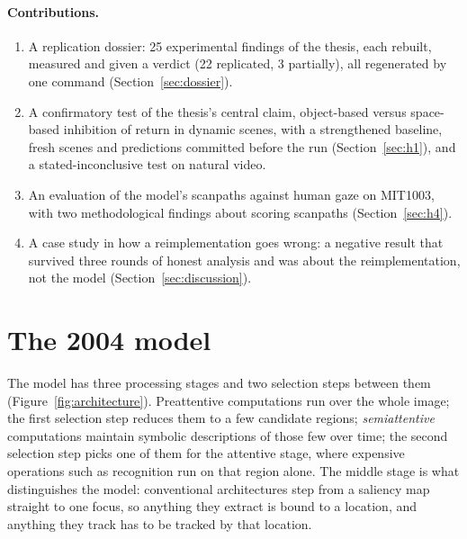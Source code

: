 \documentclass[11pt,a4paper]{article}
\begin{document}
\paragraph{Contributions.}
\begin{enumerate}
  \item A replication dossier: 25 experimental findings of the thesis, each
        rebuilt, measured and given a verdict (22 replicated, 3 partially), all
        regenerated by one command (Section~\ref{sec:dossier}).
  \item A confirmatory test of the thesis's central claim, object-based versus
        space-based inhibition of return in dynamic scenes, with a strengthened
        baseline, fresh scenes and predictions committed before the run
        (Section~\ref{sec:h1}), and a stated-inconclusive test on natural video.
  \item An evaluation of the model's scanpaths against human gaze on MIT1003,
        with two methodological findings about scoring scanpaths
        (Section~\ref{sec:h4}).
  \item A case study in how a reimplementation goes wrong: a negative result
        that survived three rounds of honest analysis and was about the
        reimplementation, not the model (Section~\ref{sec:discussion}).
\end{enumerate}

\section{The 2004 model}
\label{sec:model}

The model has three processing stages and two selection steps between them
(Figure~\ref{fig:architecture}). Preattentive computations run over the whole
image; the first selection step reduces them to a few candidate regions;
\emph{semiattentive} computations maintain symbolic descriptions of those few
over time; the second selection step picks one of them for the attentive stage,
where expensive operations such as recognition run on that region alone. The
middle stage is what distinguishes the model: conventional architectures step
from a saliency map straight to one focus, so anything they extract is bound to
a location, and anything they track has to be tracked by that location.
\end{document}
